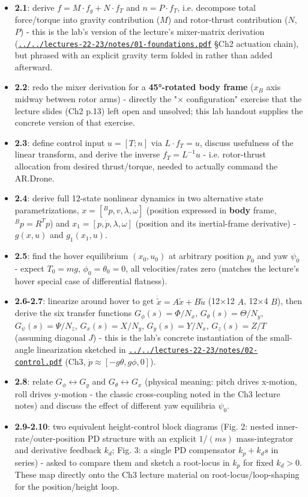 \documentclass[11pt]{article}
\begin{document}
\begin{itemize}
\item \textbf{2.1}: derive $f = M\cdot f_g + N\cdot f_T$ and $n = P\cdot f_T$, i.e. decompose total force/torque into gravity contribution ($M$) and rotor-thrust contribution ($N$, $P$) - this is the lab's version of the lecture's mixer-matrix derivation (\href{../../lectures-22-23/notes/01-foundations.pdf}{\texttt{../../lectures-22-23/notes/01-\allowbreak{}foundations.pdf}} §Ch2 actuation chain), but phrased with an explicit gravity term folded in rather than added afterward.
\item \textbf{2.2}: redo the mixer derivation for a \textbf{45°-rotated body frame} ($x_B$ axis midway between rotor arms) - directly the "× configuration" exercise that the lecture slides (Ch2 p.13) left open and unsolved; this lab handout supplies the concrete version of that exercise.
\item \textbf{2.3}: define control input $u=[T; n]$ via $L\cdot f_T = u$, discuss usefulness of the linear transform, and derive the inverse $f_T = L^{-1}u$ - i.e. rotor-thrust allocation from desired thrust/torque, needed to actually command the AR.Drone.
\item \textbf{2.4}: derive full 12-state nonlinear dynamics in two alternative state parametrizations, $x=[{}^Bp,v,\lambda,\omega]$ (position expressed in \textbf{body} frame, ${}^Bp=R^Tp$) and $x_1=[p,\dot p,\lambda,\omega]$ (position and its inertial-frame derivative) - $g(x,u)$ and $g_1(x_1,u)$.
\item \textbf{2.5}: find the hover equilibrium $(x_0,u_0)$ at arbitrary position $p_0$ and yaw $\psi_0$ - expect $T_0=mg$, $\phi_0=\theta_0=0$, all velocities/rates zero (matches the lecture's hover special case of differential flatness).
\item \textbf{2.6-2.7}: linearize around hover to get $\dot{\tilde x}=A\tilde x+B\tilde u$ (12×12 $A$, 12×4 $B$), then derive the six transfer functions $G_\phi(s)=\Phi/N_x$, $G_\theta(s)=\Theta/N_y$, $G_\psi(s)=\Psi/N_z$, $G_x(s)=X/N_y$, $G_y(s)=Y/N_x$, $G_z(s)=Z/T$ (assuming diagonal $J$) - this is the lab's concrete instantiation of the small-angle linearization sketched in \href{../../lectures-22-23/notes/02-control.pdf}{\texttt{../../lectures-22-23/notes/02-\allowbreak{}control.pdf}} (Ch3, $\ddot p\approx[-g\theta, g\phi, 0]$).
\item \textbf{2.8}: relate $G_\phi\leftrightarrow G_y$ and $G_\theta\leftrightarrow G_x$ (physical meaning: pitch drives x-motion, roll drives y-motion - the classic cross-coupling noted in the Ch3 lecture notes) and discuss the effect of different yaw equilibria $\psi_0$.
\item \textbf{2.9-2.10}: two equivalent height-control block diagrams (Fig. 2: nested inner-rate/outer-position PD structure with an explicit $1/(ms)$ mass-integrator and derivative feedback $k_d$; Fig. 3: a single PD compensator $k_p+k_ds$ in series) - asked to compare them and sketch a root-locus in $k_p$ for fixed $k_d>0$. These map directly onto the Ch3 lecture material on root-locus/loop-shaping for the position/height loop.
\end{itemize}
\end{document}
